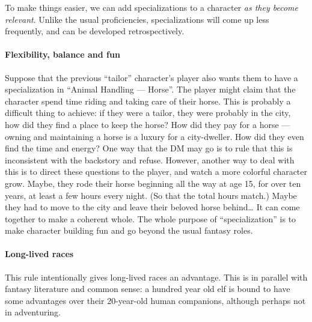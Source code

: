 \documentclass[twocolumn]{dndbook}
\begin{document}
To make things easier, we can add specializations to a character \emph{as they become relevant}.
Unlike the usual proficiencies, specializations will come up less frequently, and can be developed
retrospectively.\par

\paragraph*{Flexibility, balance and fun}
Suppose that the previous ``tailor'' character's player also wants them to have a specialization in ``Animal Handling --- Horse''.
The player might claim that the character spend time riding and taking care of their horse.
This is probably a difficult thing to achieve: if they were a tailor, they were probably in the city, how did they find a place to keep the horse?
How did they pay for a horse --- owning and maintaining a horse is a luxury for a city-dweller.
How did they even find the time and energy?
One way that the DM may go is to rule that this is inconsistent with the backstory and refuse.
However, another way to deal with this is to direct these questions to the player, and watch a more colorful character grow.
Maybe, they rode their horse beginning all the way at age 15, for over ten years, at least a few hours every night.
(So that the total hours match.)
Maybe they had to move to the city and leave their beloved horse behind\ldots
It can come together to make a coherent whole.
The whole purpose of ``specialization'' is to make character building fun and go beyond the usual fantasy roles.\par


\paragraph*{Long-lived races} This rule intentionally gives long-lived races an advantage.
This is in parallel with fantasy literature and common sense: a hundred year old elf is
bound to have some advantages over their 20-year-old human companions, although perhaps not in adventuring.\par
\end{document}
